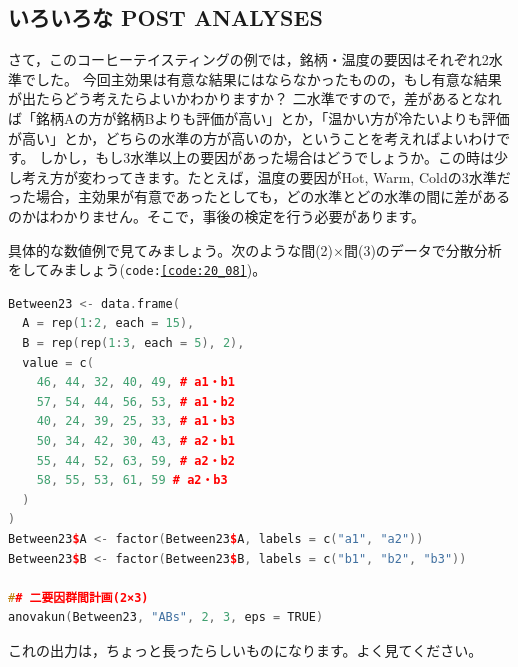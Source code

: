 \documentclass{ltjbook}
\begin{document}
\subsection{いろいろな POST ANALYSES}
さて，このコーヒーテイスティングの例では，銘柄・温度の要因はそれぞれ2水準でした。
今回主効果は有意な結果にはならなかったものの，もし有意な結果が出たらどう考えたらよいかわかりますか？
二水準ですので，差があるとなれば「銘柄Aの方が銘柄Bよりも評価が高い」とか，「温かい方が冷たいよりも評価が高い」とか，どちらの水準の方が高いのか，ということを考えればよいわけです。
しかし，もし3水準以上の要因があった場合はどうでしょうか。この時は少し考え方が変わってきます。たとえば，温度の要因がHot, Warm, Coldの3水準だった場合，主効果が有意であったとしても，どの水準とどの水準の間に差があるのかはわかりません。そこで，事後の検定を行う必要があります。

具体的な数値例で見てみましょう。次のような間(2)$\times$間(3)のデータで分散分析をしてみましょう(\texttt{code:\ref{code:20_08}})。

\begin{lstlisting}[language=c++,label={code:20_08},caption={2×3のデータを作りanovakunで実行}]
Between23 <- data.frame(
  A = rep(1:2, each = 15),
  B = rep(rep(1:3, each = 5), 2),
  value = c(
    46, 44, 32, 40, 49, # a1・b1
    57, 54, 44, 56, 53, # a1・b2
    40, 24, 39, 25, 33, # a1・b3
    50, 34, 42, 30, 43, # a2・b1
    55, 44, 52, 63, 59, # a2・b2
    58, 55, 53, 61, 59 # a2・b3
  )
)
Between23$A <- factor(Between23$A, labels = c("a1", "a2"))
Between23$B <- factor(Between23$B, labels = c("b1", "b2", "b3"))

## 二要因群間計画(2×3)
anovakun(Between23, "ABs", 2, 3, eps = TRUE)
\end{lstlisting}

これの出力は，ちょっと長ったらしいものになります。よく見てください。
\end{document}
